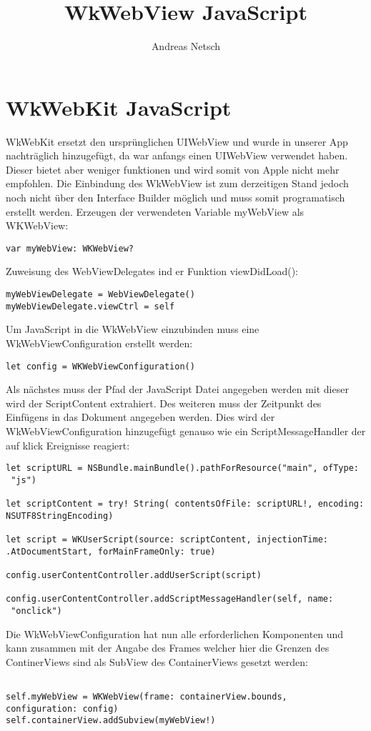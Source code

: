\documentclass[a4paper,12pt]{article}
\title{WkWebView JavaScript}
\author{Andreas Netsch}
\begin{document}
\section{ WkWebKit JavaScript}

WkWebKit ersetzt den ursprünglichen UIWebView und wurde in unserer App nachträglich hinzugefügt, da war anfangs einen UIWebView verwendet haben. Dieser bietet aber weniger funktionen und wird somit von Apple nicht mehr empfohlen. Die Einbindung des WkWebView ist zum derzeitigen Stand jedoch noch nicht über den Interface Builder möglich und muss somit programatisch erstellt werden.
Erzeugen der verwendeten Variable myWebView als WKWebView:
\begin{verbatim}
var myWebView: WKWebView?
\end{verbatim}
Zuweisung des WebViewDelegates ind er Funktion viewDidLoad():
\begin{verbatim}
myWebViewDelegate = WebViewDelegate()
myWebViewDelegate.viewCtrl = self
\end{verbatim}
Um JavaScript in die WkWebView einzubinden muss eine WkWebViewConfiguration erstellt werden:
\begin{verbatim}
let config = WKWebViewConfiguration()
\end{verbatim}
Als nächstes muss der Pfad der JavaScript Datei angegeben werden mit dieser wird der ScriptContent extrahiert. Des weiteren muss der Zeitpunkt des Einfügens in das Dokument angegeben werden. Dies wird der WkWebViewConfiguration hinzugefügt genauso wie ein ScriptMessageHandler der auf klick Ereignisse reagiert:
\begin{verbatim}
let scriptURL = NSBundle.mainBundle().pathForResource("main", ofType:
 "js")
 
let scriptContent = try! String( contentsOfFile: scriptURL!, encoding:
NSUTF8StringEncoding)

let script = WKUserScript(source: scriptContent, injectionTime: 
.AtDocumentStart, forMainFrameOnly: true)

config.userContentController.addUserScript(script)
        
config.userContentController.addScriptMessageHandler(self, name:
 "onclick")
\end{verbatim}
Die WkWebViewConfiguration hat nun alle erforderlichen Komponenten und kann zusammen mit der Angabe des Frames welcher hier die Grenzen des ContinerViews sind als SubView des ContainerViews gesetzt werden:
\begin{verbatim}

self.myWebView = WKWebView(frame: containerView.bounds,
configuration: config)
self.containerView.addSubview(myWebView!)
\end{verbatim}


\pagebreak
\end{document}
